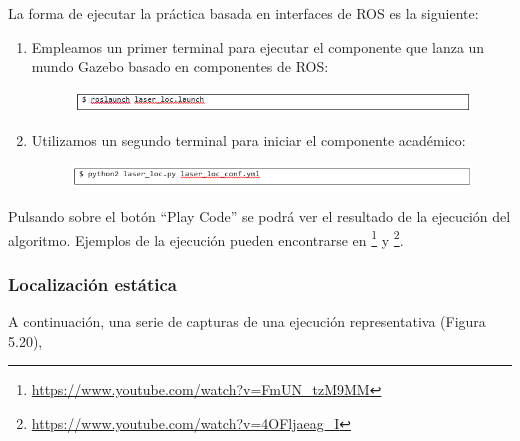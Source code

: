 La forma de ejecutar la práctica basada en interfaces de ROS es la siguiente:

\begin{enumerate}
	\item Empleamos un primer terminal para ejecutar el componente que lanza un mundo Gazebo basado en componentes de ROS:
	\begin{figure}[H]
		\begin{center}
			\includegraphics[width=0.95\linewidth]{figures/llcomando1.png}
			\label{fig.llcomando1}
		\end{center}
	\end{figure}
	\item Utilizamos un segundo terminal para iniciar el componente académico:
	\begin{figure}[H]
		\begin{center}
			\includegraphics[width=0.95\linewidth]{figures/llcomando2.png}
			\label{fig.llcomando2}
		\end{center}
	\end{figure}
\end{enumerate}

Pulsando sobre el botón “Play Code” se podrá ver el resultado de la ejecución del algoritmo. Ejemplos de la ejecución pueden encontrarse en \footnote{\url{https://www.youtube.com/watch?v=FmUN_tzM9MM}} y \footnote{\url{https://www.youtube.com/watch?v=4OFljaeag_I}}.

\subsubsection{Localización estática}
A continuación, una serie de capturas de una ejecución representativa (Figura 5.20),

